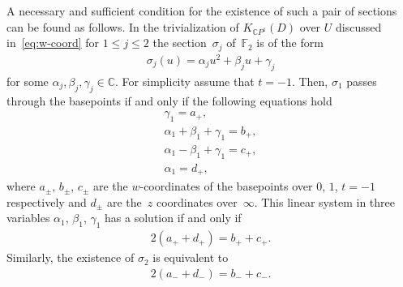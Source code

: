 \documentclass[pdftex]{sigma}
\newcommand{\CP}[1]{\mathbb{C}P^{#1}} %
\numberwithin{equation}{section}
\begin{document}
\begin{Example}
A necessary and sufficient condition for the existence of such a pair of sections can be found as follows. In the trivialization {of $K_{\CP1}(D)$ over $U$}
discussed {in~\eqref{eq:w-coord}} %
for $1\leq j \leq 2$ the section~$\sigma_j$ of~${\mathbb {F}}_2$ is of the form
\begin{gather*}
 \sigma_j (u) = \alpha_j u^2 + \beta_j u + \gamma_j
\end{gather*}
for some $\alpha_j ,\beta_j ,\gamma_j \in\mathbb{C}$. For simplicity assume that $t = -1$.
Then, $\sigma_1$ passes through the basepoints if and only if the following equations hold
\begin{gather*}
 \gamma_1 = a_+, \\
 \alpha_1 + \beta_1 + \gamma_1 = b_+, \\
 \alpha_1 - \beta_1 + \gamma_1 = c_+, \\
 \alpha_1 = d_+,
\end{gather*}
where $a_{\pm}$, $b_{\pm}$, $c_{\pm}$ are the $w$-coordinates of
the basepoints over $0$, $1$, $t=-1$ respectively and $d_{\pm}$ are the~$z$ coordinates over~$\infty$.
This linear system
in three variables $\alpha_1$, $\beta_1$, $\gamma_1$ has a solution if and
only if
\begin{gather*}
 2(a_+ + d_+ ) = b_+ + c_+.
\end{gather*}
Similarly, the existence of $\sigma_2$ is equivalent to
\begin{gather*}
 2(a_- + d_- ) = b_- + c_-.
\end{gather*}


\end{Example}
\end{document}
